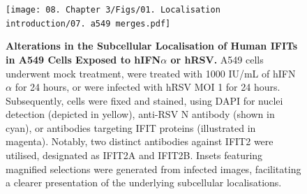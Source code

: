 \begin{figure}
    \centering
    \texttt{[image: 08. Chapter 3/Figs/01. Localisation introduction/07. a549 merges.pdf]}
    \caption[Alterations in the Subcellular Localisation of Human IFITs in A549 Cells Exposed to hIFN\(\alpha\) or hRSV.]{\textbf{Alterations in the Subcellular Localisation of Human IFITs in A549 Cells Exposed to hIFN\(\alpha\) or hRSV.} A549 cells underwent mock treatment, were treated with 1000 IU/mL of hIFN\(\alpha\) for 24 hours, or were infected with hRSV MOI 1 for 24 hours. Subsequently, cells were fixed and stained, using DAPI for nuclei detection (depicted in yellow), anti-RSV N antibody (shown in cyan), or antibodies targeting IFIT proteins (illustrated in magenta). Notably, two distinct antibodies against IFIT2 were utilised, designated as IFIT2A and IFIT2B. Insets featuring magnified selections were generated from infected images, facilitating a clearer presentation of the underlying subcellular localisations.}
    \label{fig:Alterations in the Subcellular Localisation of Human IFITs in A549 Cells Exposed to hIFNa or hRSV}
\end{figure}

